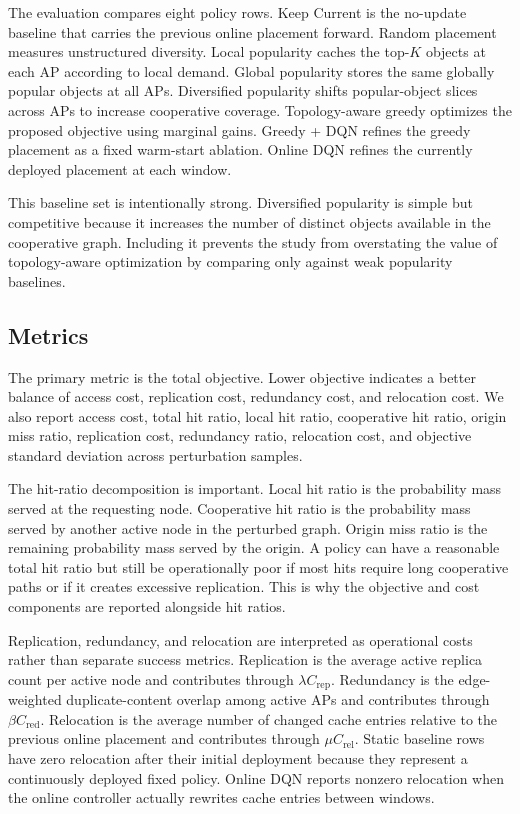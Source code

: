 The evaluation compares eight policy rows. Keep Current is the no-update baseline that carries the previous online placement forward. Random placement measures unstructured diversity. Local popularity caches the top-\(K\) objects at each AP according to local demand. Global popularity stores the same globally popular objects at all APs. Diversified popularity shifts popular-object slices across APs to increase cooperative coverage. Topology-aware greedy optimizes the proposed objective using marginal gains. Greedy + DQN refines the greedy placement as a fixed warm-start ablation. Online DQN refines the currently deployed placement at each window.

This baseline set is intentionally strong. Diversified popularity is simple but competitive because it increases the number of distinct objects available in the cooperative graph. Including it prevents the study from overstating the value of topology-aware optimization by comparing only against weak popularity baselines.

\subsection{Metrics}

The primary metric is the total objective. Lower objective indicates a better balance of access cost, replication cost, redundancy cost, and relocation cost. We also report access cost, total hit ratio, local hit ratio, cooperative hit ratio, origin miss ratio, replication cost, redundancy ratio, relocation cost, and objective standard deviation across perturbation samples.

The hit-ratio decomposition is important. Local hit ratio is the probability mass served at the requesting node. Cooperative hit ratio is the probability mass served by another active node in the perturbed graph. Origin miss ratio is the remaining probability mass served by the origin. A policy can have a reasonable total hit ratio but still be operationally poor if most hits require long cooperative paths or if it creates excessive replication. This is why the objective and cost components are reported alongside hit ratios.

Replication, redundancy, and relocation are interpreted as operational costs rather than separate success metrics. Replication is the average active replica count per active node and contributes through \(\lambda C_{\text{rep}}\). Redundancy is the edge-weighted duplicate-content overlap among active APs and contributes through \(\beta C_{\text{red}}\). Relocation is the average number of changed cache entries relative to the previous online placement and contributes through \(\mu C_{\text{rel}}\). Static baseline rows have zero relocation after their initial deployment because they represent a continuously deployed fixed policy. Online DQN reports nonzero relocation when the online controller actually rewrites cache entries between windows.

